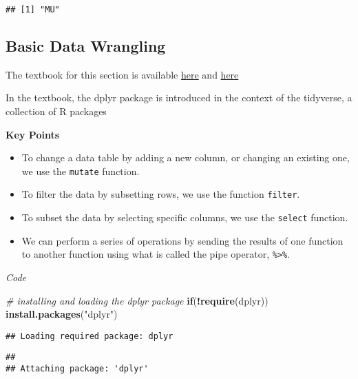 \documentclass[
]{article}
\newenvironment{Shaded}{\begin{snugshade}}{\end{snugshade}}
\newcommand{\CommentTok}[1]{\textcolor[rgb]{0.56,0.35,0.01}{\textit{#1}}}
\newcommand{\ControlFlowTok}[1]{\textcolor[rgb]{0.13,0.29,0.53}{\textbf{#1}}}
\newcommand{\KeywordTok}[1]{\textcolor[rgb]{0.13,0.29,0.53}{\textbf{#1}}}
\newcommand{\NormalTok}[1]{#1}
\newcommand{\OperatorTok}[1]{\textcolor[rgb]{0.81,0.36,0.00}{\textbf{#1}}}
\newcommand{\StringTok}[1]{\textcolor[rgb]{0.31,0.60,0.02}{#1}}
\providecommand{\tightlist}{%
  \setlength{\itemsep}{0pt}\setlength{\parskip}{0pt}}
\begin{document}
\begin{verbatim}
## [1] "MU"
\end{verbatim}

\hypertarget{basic-data-wrangling}{%
\subsection{Basic Data Wrangling}\label{basic-data-wrangling}}

The textbook for this section is available
\href{https://rafalab.github.io/dsbook/tidyverse.html\#manipulating-data-frames}{here}
and
\href{https://rafalab.github.io/dsbook/tidyverse.html\#the-pipe}{here}

In the textbook, the dplyr package is introduced in the context of the
tidyverse, a collection of R packages

\textbf{Key Points}

\begin{itemize}
\tightlist
\item
  To change a data table by adding a new column, or changing an existing
  one, we use the \texttt{mutate} function.
\item
  To filter the data by subsetting rows, we use the function
  \texttt{filter}.
\item
  To subset the data by selecting specific columns, we use the
  \texttt{select} function.
\item
  We can perform a series of operations by sending the results of one
  function to another function using what is called the pipe operator,
  \texttt{\%\textgreater{}\%}.
\end{itemize}

\emph{Code}

\begin{Shaded}
\begin{Highlighting}[]
\CommentTok{# installing and loading the dplyr package}
\ControlFlowTok{if}\NormalTok{(}\OperatorTok{!}\KeywordTok{require}\NormalTok{(dplyr)) }\KeywordTok{install.packages}\NormalTok{(}\StringTok{"dplyr"}\NormalTok{)}
\end{Highlighting}
\end{Shaded}

\begin{verbatim}
## Loading required package: dplyr
\end{verbatim}

\begin{verbatim}
## 
## Attaching package: 'dplyr'
\end{verbatim}
\end{document}
